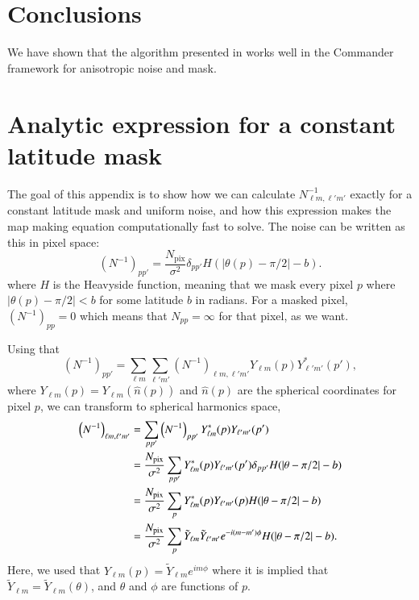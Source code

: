 \documentclass[twocolumn]{../common/aa}
\begin{document}
\section{Conclusions}
\label{sec:conclusions}

We have shown that the algorithm presented in \cite{racine:2016} works well in the Commander framework for anisotropic noise and mask.





\appendix

\section{Analytic expression for a constant latitude mask}
\label{sec:appendix}


The goal of this appendix is to show how we can calculate $N_{\ell m, \ell' m'}^{-1}$ exactly for a constant latitude mask and uniform noise, and how this expression makes the map making equation computationally fast to solve. The noise can be written as this in pixel space:
$$
\left(N^{-1} \right)_{pp'} = \frac{N_{\mathrm{pix}}}{\sigma^2} \delta_{pp'} H(|\theta(p) -\pi/2|-b).
$$
where $H$ is the Heavyside function, meaning that we mask every pixel $p$ where $|\theta(p) -\pi/2| < b$ for some latitude $b$ in radians. For a masked pixel, $\left(N^{-1} \right)_{pp}=0$ which means that $N_{pp} = \infty$ for that pixel, as we want.

Using that
$$
\left(N^{-1}\right)_{pp'} = \sum_{\ell m}\sum_{\ell' m'} \left(N^{-1}\right)_{\ell m, \ell'm'} Y_{\ell m}\left(p\right)Y^*_{\ell' m'}\left(p'\right),
$$
where $Y_{\ell m}\left(p\right) = Y_{\ell m}\left(\hat{n}(p)\right)$ and $\hat{n}(p)$ are the spherical coordinates for pixel $p$, we can transform to spherical harmonics space,
\begin{align}
\nonumber
\left(N^{-1}\right)_{\ell m, \ell' m'} &= \sum_{p p'}\left(N^{-1}\right)_{pp'}Y^{*}_{\ell m}(p)Y_{\ell' m'}(p')\\
\nonumber
&= \frac{N_{\mathrm{pix}}}{\sigma^2}\sum_{p p'} Y^{*}_{\ell m}(p)Y_{\ell' m'}(p') \delta_{pp'} H(|\theta -\pi/2|-b)\\
\nonumber
&= \frac{N_{\mathrm{pix}}}{\sigma^2}\sum_{p } Y^{*}_{\ell m}(p)Y_{\ell' m'}(p) H(|\theta -\pi/2|-b)\\
&= \frac{N_{\mathrm{pix}}}{\sigma^2}\sum_p \Tilde{Y}_{\ell m}\Tilde{Y}_{\ell' m'} e^{-i(m-m')\phi} H(|\theta -\pi/2|-b).
\end{align}
Here, we used that $Y_{\ell m}(p) = \tilde{Y}_{\ell m} e^{im\phi}$ where it is implied that $\tilde{Y}_{\ell m}=\tilde{Y}_{\ell m}(\theta)$, and $\theta$ and $\phi$ are functions of $p$.
\end{document}
